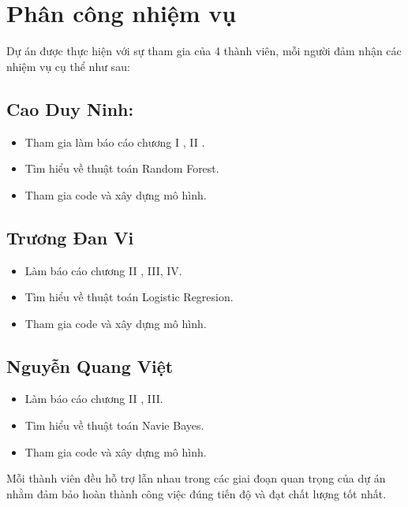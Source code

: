\section*{Phân công nhiệm vụ}
Dự án được thực hiện với sự tham gia của 4 thành viên, mỗi người đảm nhận các nhiệm vụ cụ thể như sau:
\subsection*{Cao Duy Ninh:}
\begin{itemize}
        \item{}Tham gia làm báo cáo chương I , II .
        \item{}Tìm hiểu về thuật toán Random Forest.
        \item{}Tham gia code và xây dựng mô hình.
\end{itemize}

\subsection*{Trương Đan Vi}
\begin{itemize}
        \item{}Làm báo cáo chương II , III, IV.
        \item{}Tìm hiểu về thuật toán Logistic Regresion.
        \item{}Tham gia code và xây dựng mô hình.
\end{itemize}
\subsection*{Nguyễn Quang Việt}
\begin{itemize}
        \item{}Làm báo cáo chương II , III.
        \item{}Tìm hiểu về thuật toán Navie Bayes.
        \item{}Tham gia code và xây dựng mô hình.
\end{itemize}

Mỗi thành viên đều hỗ trợ lẫn nhau trong các giai đoạn quan trọng của dự án nhằm
đảm bảo hoàn thành công việc đúng tiến độ và đạt chất lượng tốt nhất.